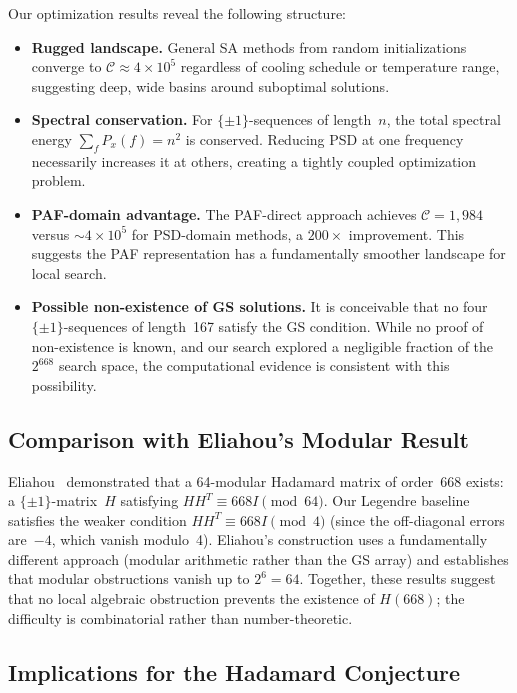 \documentclass[11pt,a4paper]{article}
\begin{document}
Our optimization results reveal the following structure:
\begin{itemize}
  \item \textbf{Rugged landscape.}  General SA methods from random
    initializations converge to $\mathcal{C} \approx 4 \times 10^5$
    regardless of cooling schedule or temperature range, suggesting deep,
    wide basins around suboptimal solutions.
  \item \textbf{Spectral conservation.}  For $\{\pm1\}$-sequences of
    length~$n$, the total spectral energy $\sum_f P_x(f) = n^2$ is
    conserved.  Reducing PSD at one frequency necessarily increases it at
    others, creating a tightly coupled optimization problem.
  \item \textbf{PAF-domain advantage.}  The PAF-direct approach achieves
    $\mathcal{C} = 1{,}984$ versus $\sim\!4 \times 10^5$ for PSD-domain
    methods, a $200\times$ improvement.  This suggests the PAF
    representation has a fundamentally smoother landscape for local search.
  \item \textbf{Possible non-existence of GS solutions.}  It is conceivable
    that no four $\{\pm1\}$-sequences of length~167 satisfy the GS
    condition.  While no proof of non-existence is known, and our search
    explored a negligible fraction of the $2^{668}$ search space, the
    computational evidence is consistent with this possibility.
\end{itemize}

\subsection{Comparison with Eliahou's Modular Result}

Eliahou~\cite{eliahou2025modular} demonstrated that a 64-modular Hadamard
matrix of order~668 exists: a $\{\pm 1\}$-matrix~$H$ satisfying
$HH^T \equiv 668I \pmod{64}$.  Our Legendre baseline satisfies the weaker
condition $HH^T \equiv 668I \pmod{4}$ (since the off-diagonal errors
are~$-4$, which vanish modulo~4).  Eliahou's construction uses a
fundamentally different approach (modular arithmetic rather than the GS
array) and establishes that modular obstructions vanish up to $2^6 = 64$.
Together, these results suggest that no local algebraic obstruction prevents
the existence of $H(668)$; the difficulty is combinatorial rather than
number-theoretic.

\subsection{Implications for the Hadamard Conjecture}
\end{document}
